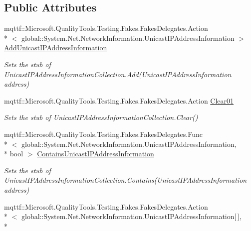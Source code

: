 \subsection*{Public Attributes}
\begin{DoxyCompactItemize}
\item 
mqttf\-::\-Microsoft.\-Quality\-Tools.\-Testing.\-Fakes.\-Fakes\-Delegates.\-Action\\*
$<$ global\-::\-System.\-Net.\-Network\-Information.\-Unicast\-I\-P\-Address\-Information $>$ \hyperlink{class_system_1_1_net_1_1_network_information_1_1_fakes_1_1_stub_unicast_i_p_address_information_collection_a46f682548ae7cc408ef21622300bba28}{Add\-Unicast\-I\-P\-Address\-Information}
\begin{DoxyCompactList}\small\item\em Sets the stub of Unicast\-I\-P\-Address\-Information\-Collection.\-Add(\-Unicast\-I\-P\-Address\-Information address)\end{DoxyCompactList}\item 
mqttf\-::\-Microsoft.\-Quality\-Tools.\-Testing.\-Fakes.\-Fakes\-Delegates.\-Action \hyperlink{class_system_1_1_net_1_1_network_information_1_1_fakes_1_1_stub_unicast_i_p_address_information_collection_ae5db87d0d68eeb31ae278c9dd9c5a9aa}{Clear01}
\begin{DoxyCompactList}\small\item\em Sets the stub of Unicast\-I\-P\-Address\-Information\-Collection.\-Clear()\end{DoxyCompactList}\item 
mqttf\-::\-Microsoft.\-Quality\-Tools.\-Testing.\-Fakes.\-Fakes\-Delegates.\-Func\\*
$<$ global\-::\-System.\-Net.\-Network\-Information.\-Unicast\-I\-P\-Address\-Information, \\*
bool $>$ \hyperlink{class_system_1_1_net_1_1_network_information_1_1_fakes_1_1_stub_unicast_i_p_address_information_collection_a5dc391e839bb33351df840c9ae237cea}{Contains\-Unicast\-I\-P\-Address\-Information}
\begin{DoxyCompactList}\small\item\em Sets the stub of Unicast\-I\-P\-Address\-Information\-Collection.\-Contains(\-Unicast\-I\-P\-Address\-Information address)\end{DoxyCompactList}\item 
mqttf\-::\-Microsoft.\-Quality\-Tools.\-Testing.\-Fakes.\-Fakes\-Delegates.\-Action\\*
$<$ global\-::\-System.\-Net.\-Network\-Information.\-Unicast\-I\-P\-Address\-Information\mbox{[}$\,$\mbox{]}, \\*

\end{DoxyCompactItemize}
